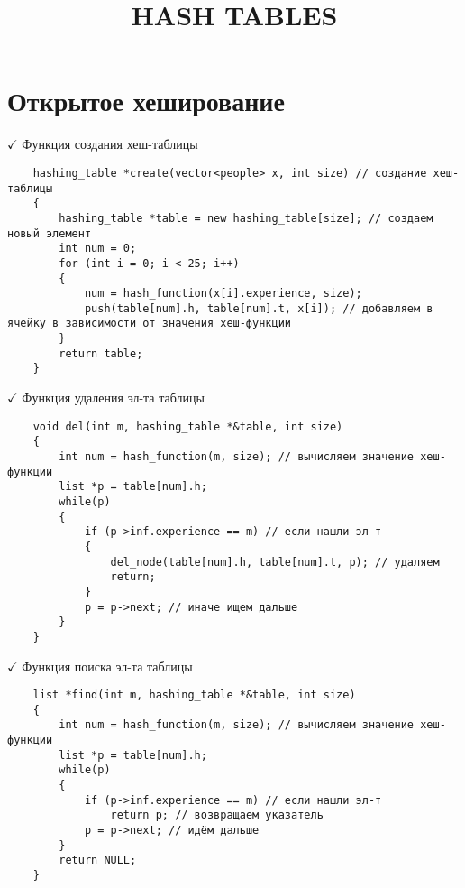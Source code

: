 \documentclass[a4paper, 14pt]{extarticle}
\author{}
\title{\MakeUppercase{Hash tables}}
\date{}
\begin{document}
\maketitle
\thispagestyle{empty}
\pagestyle{empty}
\section*{Открытое хеширование}
$\checkmark$ Функция создания хеш-таблицы
\begin{verbatim}
    hashing_table *create(vector<people> x, int size) // создание хеш-таблицы
    {
        hashing_table *table = new hashing_table[size]; // создаем новый элемент
        int num = 0;
        for (int i = 0; i < 25; i++)
        {
            num = hash_function(x[i].experience, size); 
            push(table[num].h, table[num].t, x[i]); // добавляем в ячейку в зависимости от значения хеш-функции
        }
        return table;
    }
\end{verbatim}
$\checkmark$ Функция удаления эл-та таблицы
\begin{verbatim}
    void del(int m, hashing_table *&table, int size) 
    { 
        int num = hash_function(m, size); // вычисляем значение хеш-функции
        list *p = table[num].h;
        while(p)
        {
            if (p->inf.experience == m) // если нашли эл-т 
            {
                del_node(table[num].h, table[num].t, p); // удаляем
                return;
            }
            p = p->next; // иначе ищем дальше
        }
    }
\end{verbatim}
$\checkmark$ Функция поиска эл-та таблицы
\begin{verbatim}
    list *find(int m, hashing_table *&table, int size)
    {
        int num = hash_function(m, size); // вычисляем значение хеш-функции
        list *p = table[num].h;
        while(p)
        {
            if (p->inf.experience == m) // если нашли эл-т 
                return p; // возвращаем указатель
            p = p->next; // идём дальше
        }
        return NULL;
    }
\end{verbatim}
\end{document}
